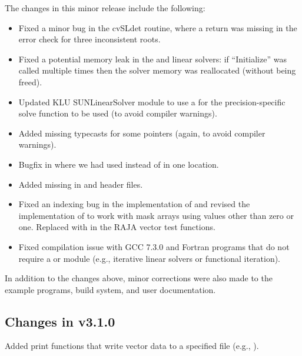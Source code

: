 The changes in this minor release include the following:
\begin{itemize}
\item Fixed a minor bug in the cvSLdet routine, where a return was missing
  in the error check for three inconsistent roots.

\item Fixed a potential memory leak in the {\spgmr} and {\spfgmr} linear
  solvers: if ``Initialize'' was called multiple times then the solver
  memory was reallocated (without being freed).
  
\item Updated KLU SUNLinearSolver module to use a  for the
  precision-specific solve function to be used (to avoid compiler 
  warnings).  

\item Added missing typecasts for some  pointers (again, to
  avoid compiler warnings). 

\item Bugfix in  where we had used 
  instead of  in one location.

\item Added missing  in {\nvector} and {\sunmatrix}
  header files.

\item Fixed an indexing bug in the {\cuda} {\nvector} implementation of
   and revised the {\raja} {\nvector} implementation of
   to work with mask arrays using values other than zero or
  one. Replaced  with  in the RAJA vector test functions.

\item Fixed compilation issue with GCC 7.3.0 and Fortran programs that do
  not require a {\sunmatrix} or {\sunlinsol} module (e.g., iterative
  linear solvers or functional iteration).
\end{itemize}
In addition to the changes above, minor corrections were also made to the
example programs, build system, and user documentation.

\subsection*{Changes in v3.1.0}

Added {\nvector} print functions that write vector data to a specified
file (e.g., ).

